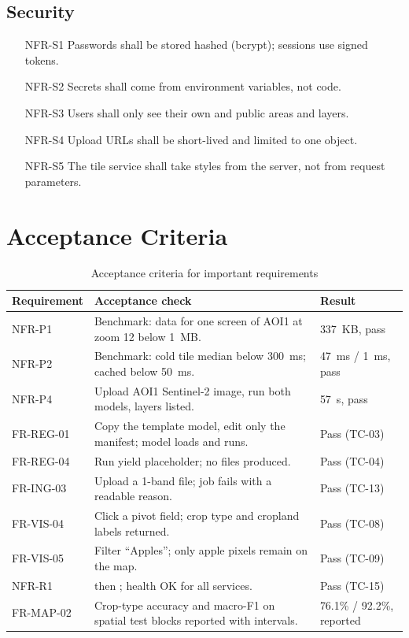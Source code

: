 \subsection{Security}
\begin{itemize}[leftmargin=1.8cm]
  \item[NFR-S1] Passwords shall be stored hashed (bcrypt); sessions use signed tokens.
  \item[NFR-S2] Secrets shall come from environment variables, not code.
  \item[NFR-S3] Users shall only see their own and public areas and layers.
  \item[NFR-S4] Upload URLs shall be short-lived and limited to one object.
  \item[NFR-S5] The tile service shall take styles from the server, not from request parameters.
\end{itemize}

\section{Acceptance Criteria}
\begin{table}[htbp]
\centering\small
\caption{Acceptance criteria for important requirements}
\label{tab:acceptance}
\begin{tabularx}{\textwidth}{L{2.2cm} Y L{2.2cm}}
\toprule
\textbf{Requirement} & \textbf{Acceptance check} & \textbf{Result}\\
\midrule
NFR-P1 & Benchmark: data for one screen of AOI1 at zoom 12 below 1~MB. & 337~KB, pass\\
NFR-P2 & Benchmark: cold tile median below 300~ms; cached below 50~ms. & 47~ms / 1~ms, pass\\
NFR-P4 & Upload AOI1 Sentinel-2 image, run both models, layers listed. & 57~s, pass\\
FR-REG-01 & Copy the template model, edit only the manifest; model loads and runs. & Pass (TC-03)\\
FR-REG-04 & Run yield placeholder; no files produced. & Pass (TC-04)\\
FR-ING-03 & Upload a 1-band file; job fails with a readable reason. & Pass (TC-13)\\
FR-VIS-04 & Click a pivot field; crop type and cropland labels returned. & Pass (TC-08)\\
FR-VIS-05 & Filter ``Apples''; only apple pixels remain on the map. & Pass (TC-09)\\
NFR-R1 &  then ; health OK for all services. & Pass (TC-15)\\
FR-MAP-02 & Crop-type accuracy and macro-F1 on spatial test blocks reported with intervals. & 76.1\% / 92.2\%, reported\\
\bottomrule
\end{tabularx}
\end{table}

